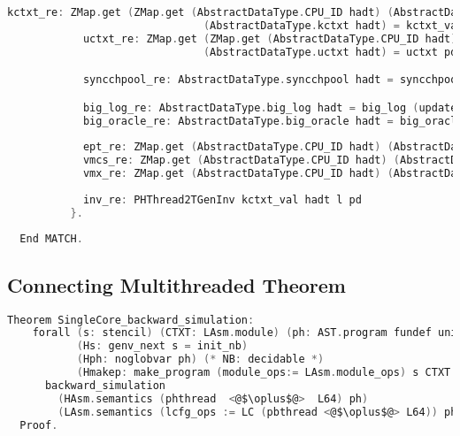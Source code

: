 \begin{lstlisting}[language=C]
            kctxt_re: ZMap.get (ZMap.get (AbstractDataType.CPU_ID hadt) (AbstractDataType.cid hadt)) 
                               (AbstractDataType.kctxt hadt) = kctxt_val;
            uctxt_re: ZMap.get (ZMap.get (AbstractDataType.CPU_ID hadt) (AbstractDataType.cid hadt))
                               (AbstractDataType.uctxt hadt) = uctxt pd;

            syncchpool_re: AbstractDataType.syncchpool hadt = syncchpool pd;

            big_log_re: AbstractDataType.big_log hadt = big_log (update init_shared_adt l);
            big_oracle_re: AbstractDataType.big_oracle hadt = big_oracle (update init_shared_adt l);
            
            ept_re: ZMap.get (AbstractDataType.CPU_ID hadt) (AbstractDataType.ept hadt) = ept pd;
            vmcs_re: ZMap.get (AbstractDataType.CPU_ID hadt) (AbstractDataType.vmcs hadt) = vmcs pd;
            vmx_re: ZMap.get (AbstractDataType.CPU_ID hadt) (AbstractDataType.vmx hadt) = vmx pd;
            
            inv_re: PHThread2TGenInv kctxt_val hadt l pd
          }.
                                                       
  End MATCH.

\end{lstlisting}


\subsection{Connecting Multithreaded Theorem}
\label{chapter:certikos:subsec:connecting-multithreaded-theroem}

\begin{lstlisting}[language=C]
  Theorem SingleCore_backward_simulation:
    forall (s: stencil) (CTXT: LAsm.module) (ph: AST.program fundef unit)
           (Hs: genv_next s = init_nb)
           (Hph: noglobvar ph) (* NB: decidable *)
           (Hmakep: make_program (module_ops:= LAsm.module_ops) s CTXT (phbthread <@$\oplus$@> L64) = OK ph),
      backward_simulation
        (HAsm.semantics (phthread  <@$\oplus$@>  L64) ph)
        (LAsm.semantics (lcfg_ops := LC (pbthread <@$\oplus$@> L64)) ph).
  Proof.
\end{lstlisting}


